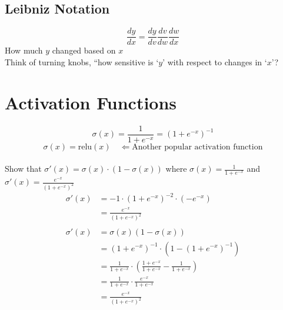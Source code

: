\subsection{Leibniz Notation}
\[
\frac{dy}{dx} = \frac{dy}{dv} \frac{dv}{dw} \frac{dw}{dx}
\]
How much $y$ changed based on $x$ \\
Think of turning knobs, ``how sensitive is `$y$' with respect to changes in `$x$'?

\section{Activation Functions}

$$\sigma(x) = \frac{1}{1+e^{-x}} = (1+e^{-x})^{-1}$$
$$\sigma(x) = \text{relu}(x) \quad \Leftarrow\text{Another popular activation function}$$
\\
Show that $\sigma'(x) = \sigma(x) \cdot (1-\sigma(x))$ where $\sigma(x) = \frac{1}{1+e^{-x}}$ and $\sigma'(x) = \frac{e^{-x}}{(1+e^{-x})^2}$
\begin{align}
\sigma'(x) &= -1 \cdot (1+e^{-x})^{-2} \cdot (-e^{-x}) \\
&= \frac{e^{-x}}{(1+e^{-x})^2} \\
\\
\sigma'(x) &= \sigma(x)(1-\sigma(x)) \\
&= (1+e^{-x})^{-1} \cdot \left( 1 - (1+e^{-x})^{-1} \right) \\
&= \frac{1}{1+e^{-x}} \cdot \left( \frac{1+e^{-x}}{1+e^{-x}} - \frac{1}{1+e^{-x}} \right) \\
&= \frac{1}{1+e^{-x}} \cdot \frac{e^{-x}}{1+e^{-x}} \\
&= \frac{e^{-x}}{(1+e^{-x})^2}
\end{align}

